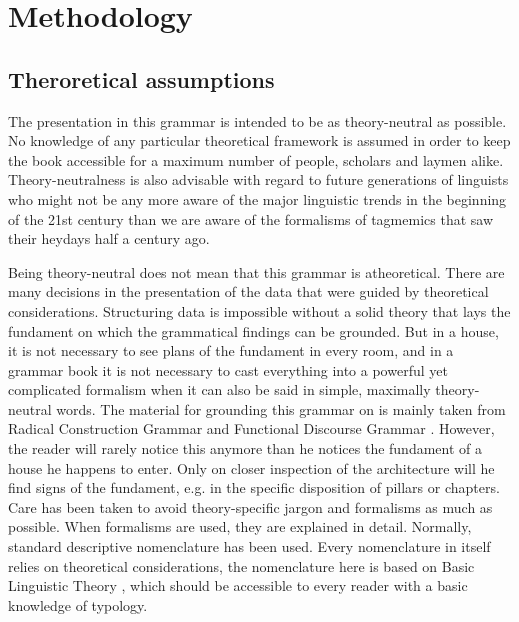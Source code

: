\chapter{Methodology}
\section{Theroretical assumptions}
The presentation in this grammar is intended to be as theory-neutral as possible. No knowledge of any particular theoretical framework is assumed in order to keep the book accessible for a maximum number of people, scholars and laymen alike. Theory-neutralness is also advisable with regard to future generations of linguists who might not be any more aware of the major linguistic trends in the beginning of the 21st century than we are aware of the formalisms of tagmemics that saw their heydays half a century ago.

Being theory-neutral does not mean that this grammar is atheoretical. There are many decisions in the presentation of the data that were guided by theoretical considerations. Structuring data is impossible without a solid theory that lays the fundament on which the grammatical findings can be grounded. But in a house, it is not necessary to see plans of the fundament in every room, and in a grammar book it is not necessary to cast everything into a powerful yet complicated formalism when it can also be said in simple, maximally theory-neutral words. The material for grounding this grammar on is mainly taken from Radical Construction Grammar \citep{Croft2001rcg} and Functional Discourse Grammar \citep{HengeveldEtAl2008fdg}. However, the reader will rarely notice this anymore than he notices the fundament of a house he happens to enter. Only on closer inspection of the architecture will he find signs of the fundament, e.g. in the specific disposition of pillars or chapters. Care has been taken to avoid theory-specific jargon and formalisms as much as possible. When formalisms are used, they are explained in detail. Normally, standard descriptive nomenclature has been used. Every nomenclature in itself relies on theoretical considerations, the nomenclature here is based on Basic Linguistic Theory \citet{Dryer2006blt, Dixon1997riseandfall}, which should be accessible to every reader with a basic knowledge of typology.

